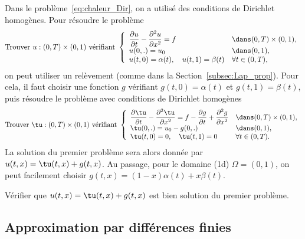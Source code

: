 \documentclass[12pt,a4paper,twoside]{article}
\begin{document}
\begin{remark}
  Dans le probl\`eme~\eqref{eq:chaleur_Dir}, on a utilis\'e des conditions de Dirichlet homog\`enes.
  Pour r\'esoudre le probl\`eme
  \begin{equation*}
    \text{Trouver $u : (0,T) \times (0,1)$ v\'erifiant }
    \left\{
      \begin{array}{l l}
        \dfrac{\partial u}{\partial t} - \dfrac{\partial^2 u}{\partial x^2} = f 
        &\dans (0,T) \times (0,1) ,
        \\
        u(0,.) = u_0 
        & \dans (0,1) ,
        \\
        u(t,0) = \alpha(t) , \quad u(t,1) = \beta(t) & \forall t \in (0,T) ,
      \end{array}
    \right.
  \end{equation*}
  on peut utiliser un rel\`evement (comme dans la Section~\ref{subsec:Lap_prop}).
  Pour cela, il faut choisir une fonction $g$ v\'erifiant $g(t,0) = \alpha(t)$
  et $g(t,1) = \beta(t)$,
  puis r\'esoudre le probl\`eme avec conditions de Dirichlet homog\`enes
  \begin{equation*}
    \text{Trouver $\tu : (0,T) \times (0,1)$ v\'erifiant }
    \left\{
      \begin{array}{l l}
        \dfrac{\partial \tu}{\partial t} - \dfrac{\partial^2 \tu}{\partial x^2}
        = f - \dfrac{\partial g}{\partial t} + \dfrac{\partial^2 g}{\partial x^2}
        &\dans (0,T) \times (0,1) ,
        \\
        \tu(0,.) = u_0 - g(0,.)
        & \dans (0,1) ,
        \\
        \tu(t,0) = 0 , \quad \tu(t,1) = 0 & \forall t \in (0,T) .
      \end{array}
    \right.
  \end{equation*}
  La solution du premier probl\`eme sera alors donn\'ee par $u(t,x) = \tu(t,x) + g(t,x)$.
  Au passage, pour le domaine (1d) $\Omega = (0,1)$, on peut facilement
  choisir $g(t,x) = (1-x) \alpha(t) + x \beta(t)$.
\end{remark}

\begin{exercise}
  V\'erifier que $u(t,x) = \tu(t,x) + g(t,x)$ est bien solution du premier probl\`eme.
\end{exercise}

\subsection{Approximation par diff\'erences finies}
\end{document}
